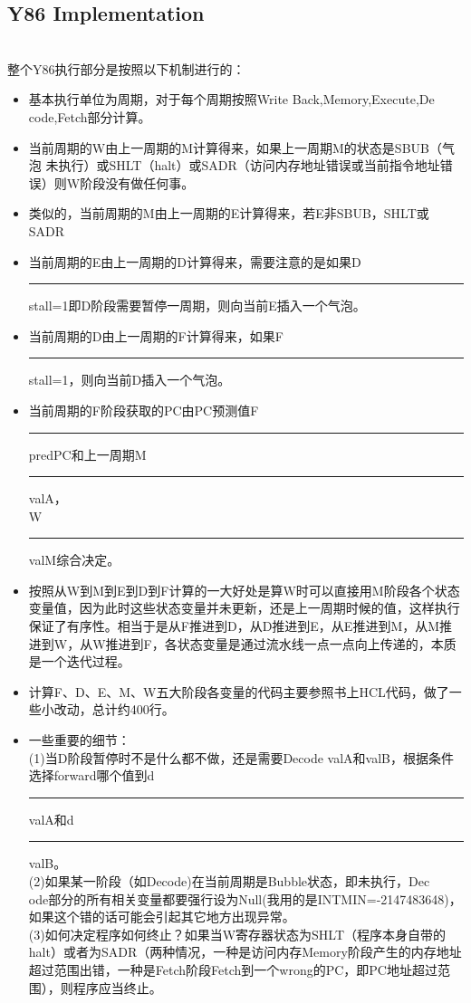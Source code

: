 \documentclass{article}
\begin{document}
\begin{spacing}{1.5}
\section{Y86 Implementation}
\noindent
{}
\setlength{\hangindent}{2.8em}\\
整个Y86执行部分是按照以下机制进行的：
\begin{itemize}
\item
基本执行单位为周期，对于每个周期按照Write Back,Memory,Execute,De\\
code,Fetch部分计算。
\item
当前周期的W由上一周期的M计算得来，如果上一周期M的状态是SBUB（气泡 未执行）或SHLT（halt）或SADR（访问内存地址错误或当前指令地址错误）则W阶段没有做任何事。
\item
类似的，当前周期的M由上一周期的E计算得来，若E非SBUB，SHLT或SADR
\item
当前周期的E由上一周期的D计算得来，需要注意的是如果D\rule[-2pt]{0.2cm}{0.5pt}stall=1即D阶段需要暂停一周期，则向当前E插入一个气泡。
\item
当前周期的D由上一周期的F计算得来，如果F\rule[-2pt]{0.2cm}{0.5pt}stall=1，则向当前D插入一个气泡。
\item
当前周期的F阶段获取的PC由PC预测值F\rule[-2pt]{0.2cm}{0.5pt}predPC和上一周期M\rule[-2pt]{0.2cm}{0.5pt}valA，\\
W\rule[-2pt]{0.2cm}{0.5pt}valM综合决定。
\item
按照从W到M到E到D到F计算的一大好处是算W时可以直接用M阶段各个状态变量值，因为此时这些状态变量并未更新，还是上一周期时候的值，这样执行保证了有序性。相当于是从F推进到D，从D推进到E，从E推进到M，从M推进到W，从W推进到F，各状态变量是通过流水线一点一点向上传递的，本质是一个迭代过程。
\item
计算F、D、E、M、W五大阶段各变量的代码主要参照书上HCL代码，做了一些小改动，总计约400行。
\item
一些重要的细节：\\
(1)当D阶段暂停时不是什么都不做，还是需要Decode valA和valB，根据条件选择forward哪个值到d\rule[-2pt]{0.2cm}{0.5pt}valA和d\rule[-2pt]{0.2cm}{0.5pt}valB。\\
(2)如果某一阶段（如Decode)在当前周期是Bubble状态，即未执行，Dec\\
ode部分的所有相关变量都要强行设为Null(我用的是INTMIN=-2147483648)，如果这个错的话可能会引起其它地方出现异常。\\
(3)如何决定程序如何终止？如果当W寄存器状态为SHLT（程序本身自带的halt）或者为SADR（两种情况，一种是访问内存Memory阶段产生的内存地址超过范围出错，一种是Fetch阶段Fetch到一个wrong的PC，即PC地址超过范围），则程序应当终止。\\

\end{itemize}
\end{spacing}
\end{document}

